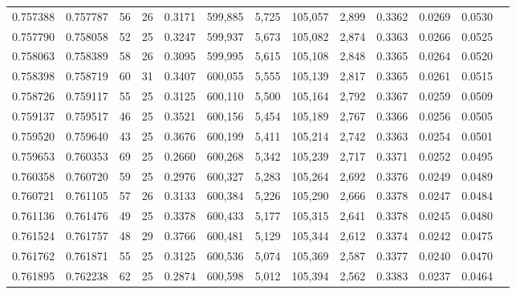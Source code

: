 \begin{tabular}{rrrrrrrrrrrrr}
0.757388 & 0.757787 &  56 &  26 &                                     0.3171 & 599,885 &   5,725 & 105,057 &   2,899 & 0.3362 & 0.0269 & 0.0530 \\
0.757790 & 0.758058 &  52 &  25 &                                     0.3247 & 599,937 &   5,673 & 105,082 &   2,874 & 0.3363 & 0.0266 & 0.0525 \\
0.758063 & 0.758389 &  58 &  26 &                                     0.3095 & 599,995 &   5,615 & 105,108 &   2,848 & 0.3365 & 0.0264 & 0.0520 \\
0.758398 & 0.758719 &  60 &  31 &                                     0.3407 & 600,055 &   5,555 & 105,139 &   2,817 & 0.3365 & 0.0261 & 0.0515 \\
0.758726 & 0.759117 &  55 &  25 &                                     0.3125 & 600,110 &   5,500 & 105,164 &   2,792 & 0.3367 & 0.0259 & 0.0509 \\
0.759137 & 0.759517 &  46 &  25 &                                     0.3521 & 600,156 &   5,454 & 105,189 &   2,767 & 0.3366 & 0.0256 & 0.0505 \\
0.759520 & 0.759640 &  43 &  25 &                                     0.3676 & 600,199 &   5,411 & 105,214 &   2,742 & 0.3363 & 0.0254 & 0.0501 \\
0.759653 & 0.760353 &  69 &  25 &                                     0.2660 & 600,268 &   5,342 & 105,239 &   2,717 & 0.3371 & 0.0252 & 0.0495 \\
0.760358 & 0.760720 &  59 &  25 &                                     0.2976 & 600,327 &   5,283 & 105,264 &   2,692 & 0.3376 & 0.0249 & 0.0489 \\
0.760721 & 0.761105 &  57 &  26 &                                     0.3133 & 600,384 &   5,226 & 105,290 &   2,666 & 0.3378 & 0.0247 & 0.0484 \\
0.761136 & 0.761476 &  49 &  25 &                                     0.3378 & 600,433 &   5,177 & 105,315 &   2,641 & 0.3378 & 0.0245 & 0.0480 \\
0.761524 & 0.761757 &  48 &  29 &                                     0.3766 & 600,481 &   5,129 & 105,344 &   2,612 & 0.3374 & 0.0242 & 0.0475 \\
0.761762 & 0.761871 &  55 &  25 &                                     0.3125 & 600,536 &   5,074 & 105,369 &   2,587 & 0.3377 & 0.0240 & 0.0470 \\
0.761895 & 0.762238 &  62 &  25 &                                     0.2874 & 600,598 &   5,012 & 105,394 &   2,562 & 0.3383 & 0.0237 & 0.0464 \\

\end{tabular}
